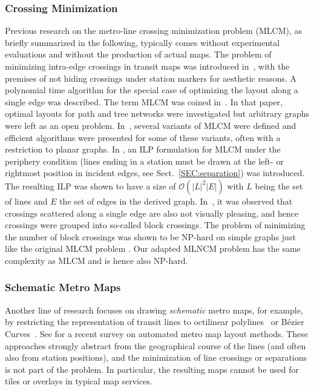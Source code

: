 \documentclass[format=acmsmall, review=false, screen=true]{acmart}
\begin{document}
\subsubsection{Crossing Minimization}


Previous research on the metro-line crossing minimization problem (MLCM), as briefly summarized in the following, typically comes without experimental evaluations and without the production of actual maps.
The problem of minimizing intra-edge crossings in transit maps was introduced in~\cite{ben06},
with the premises of not hiding crossings under station markers for aesthetic reasons.
A polynomial time algorithm for the special case of optimizing the layout along a single edge was described.
The term MLCM was coined in~\cite{bek07}.
In that paper, optimal layouts for path and tree networks were investigated but arbitrary graphs were left as an open problem.
In~\cite{arg08, arg10, nol09}, several variants of MLCM were defined and efficient algorithms were presented for some of these variants, often with a restriction to planar graphs.
In \cite{asq08}, an ILP formulation for MLCM under the periphery condition (lines ending in a station must be drawn at the left- or rightmost position in  incident edges, see Sect.~\ref{SEC:separation}) was introduced.
The resulting ILP was shown to have a size of $\mathcal{O}(|L|^2|E|)$ with $L$ being the set of lines and $E$ the set of edges in the derived graph.
In~\cite{fin13b}, it was observed that crossings scattered along a single edge are also not visually pleasing,
and hence crossings were grouped into so-called block crossings.
The problem of minimizing the number of block crossings was shown to be NP-hard on simple graphs just like the original MLCM problem \cite{fin13a}.
Our adapted MLNCM problem has the same complexity as MLCM and is hence also NP-hard.


\subsubsection{Schematic Metro Maps}

Another line of research focuses on drawing \emph{schematic} metro maps, for example, by restricting the representation of transit lines to octilinear polylines~\cite{hon06} or B\'ezier Curves~\cite{fin12}. See \cite{nol14} for a recent survey on automated metro map layout methods. These approaches strongly abstract from the geographical course of the lines (and often also from station positions), and the minimization of line crossings or separations is not part of the problem.
In particular, the resulting maps cannot be used for tiles or overlays in typical map services.
\end{document}
